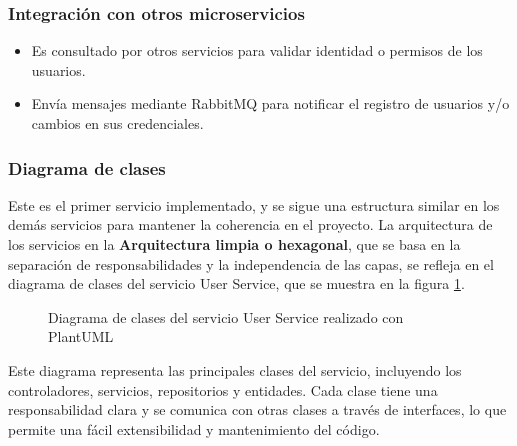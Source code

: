\subsubsection{Integración con otros microservicios}

\begin{itemize}
  \item Es consultado por otros servicios para validar identidad o permisos de los usuarios.
  \item Envía mensajes mediante RabbitMQ para notificar el registro de usuarios y/o cambios en sus credenciales.
\end{itemize}

\subsubsection{Diagrama de clases}
Este es el primer servicio implementado, y se sigue una estructura similar en los demás servicios para mantener la coherencia en el proyecto. La arquitectura de los servicios en la \textbf{Arquitectura limpia o hexagonal}, que se basa en la separación de responsabilidades y la independencia de las capas, se refleja en el diagrama de clases del servicio User Service, que se muestra en la figura \ref{fig:user-service-class-diagram}.
\begin{figure}[H]
    \centering
    \caption{Diagrama de clases del servicio User Service realizado con PlantUML}
    \label{fig:user-service-class-diagram}
\end{figure}

Este diagrama representa las principales clases del servicio, incluyendo los controladores, servicios, repositorios y entidades. Cada clase tiene una responsabilidad clara y se comunica con otras clases a través de interfaces, lo que permite una fácil extensibilidad y mantenimiento del código.

